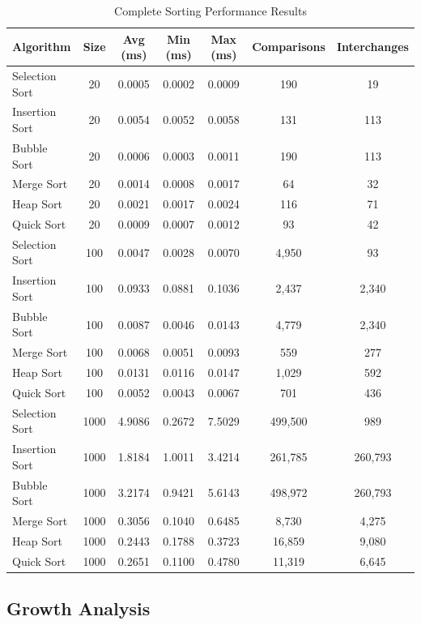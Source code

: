 \documentclass[12pt,a4paper]{article}
\begin{document}
\begin{table}[H]
\centering
\caption{Complete Sorting Performance Results}
\scriptsize
\begin{tabular}{@{}lcccccc@{}}
\toprule
\textbf{Algorithm} & \textbf{Size} & \textbf{Avg (ms)} & \textbf{Min (ms)} & \textbf{Max (ms)} & \textbf{Comparisons} & \textbf{Interchanges} \\
\midrule
Selection Sort & 20 & 0.0005 & 0.0002 & 0.0009 & 190 & 19 \\
Insertion Sort & 20 & 0.0054 & 0.0052 & 0.0058 & 131 & 113 \\
Bubble Sort & 20 & 0.0006 & 0.0003 & 0.0011 & 190 & 113 \\
Merge Sort & 20 & 0.0014 & 0.0008 & 0.0017 & 64 & 32 \\
Heap Sort & 20 & 0.0021 & 0.0017 & 0.0024 & 116 & 71 \\
Quick Sort & 20 & 0.0009 & 0.0007 & 0.0012 & 93 & 42 \\
\midrule
Selection Sort & 100 & 0.0047 & 0.0028 & 0.0070 & 4,950 & 93 \\
Insertion Sort & 100 & 0.0933 & 0.0881 & 0.1036 & 2,437 & 2,340 \\
Bubble Sort & 100 & 0.0087 & 0.0046 & 0.0143 & 4,779 & 2,340 \\
Merge Sort & 100 & 0.0068 & 0.0051 & 0.0093 & 559 & 277 \\
Heap Sort & 100 & 0.0131 & 0.0116 & 0.0147 & 1,029 & 592 \\
Quick Sort & 100 & 0.0052 & 0.0043 & 0.0067 & 701 & 436 \\
\midrule
Selection Sort & 1000 & 4.9086 & 0.2672 & 7.5029 & 499,500 & 989 \\
Insertion Sort & 1000 & 1.8184 & 1.0011 & 3.4214 & 261,785 & 260,793 \\
Bubble Sort & 1000 & 3.2174 & 0.9421 & 5.6143 & 498,972 & 260,793 \\
Merge Sort & 1000 & 0.3056 & 0.1040 & 0.6485 & 8,730 & 4,275 \\
Heap Sort & 1000 & 0.2443 & 0.1788 & 0.3723 & 16,859 & 9,080 \\
Quick Sort & 1000 & 0.2651 & 0.1100 & 0.4780 & 11,319 & 6,645 \\
\bottomrule
\end{tabular}
\end{table}

\subsection{Growth Analysis}
\end{document}
